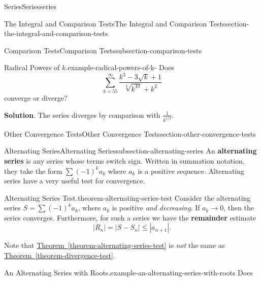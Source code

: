 \documentclass[oneside,10pt,]{book}
\newcommand{\terminology}[1]{\textbf{#1}}
\numberwithin{equation}{section}
\begin{document}
\begin{chapterptx}{Series}{}{Series}{}{}{series}
\begin{sectionptx}{The Integral and Comparison Tests}{}{The Integral and Comparison Tests}{}{}{section-the-integral-and-comparison-tests}
\begin{subsectionptx}{Comparison Tests}{}{Comparison Tests}{}{}{subsection-comparison-tests}
\begin{example}{Radical Powers of \(k\).}{example-radical-powers-of-k-}%
\hypertarget{p-896}{}%
Does%
\begin{equation*}
\sum_{k=55}^{\infty}\frac{k^{3} - 3\sqrt{k} + 1}{\sqrt[4]{k^{10}} + k^{2}}
\end{equation*}
converge or diverge?%
\par\smallskip%
\noindent\textbf{Solution}.\hypertarget{solution-184}{}\quad%
\hypertarget{p-897}{}%
The series diverges by comparison with \(\frac{1}{k^{1/3}}\).%
\end{example}
\end{subsectionptx}
\end{sectionptx}
%
%
\typeout{************************************************}
\typeout{************************************************}
%
\begin{sectionptx}{Other Convergence Tests}{}{Other Convergence Tests}{}{}{section-other-convergence-tests}
%
%
\typeout{************************************************}
\typeout{************************************************}
%
\begin{subsectionptx}{Alternating Series}{}{Alternating Series}{}{}{subsection-alternating-series}
\hypertarget{p-898}{}%
An \terminology{alternating series} is any series whose terms switch sign. Written in summation notation, they take the form \(\sum (-1)^{k}a_{k}\) where \(a_{k}\) is a positive sequence. Alternating series have a very useful test for convergence.%
\begin{theorem}{Alternating Series Test.}{}{theorem-alternating-series-test}%
\hypertarget{p-899}{}%
Consider the alternating series \(S = \sum (-1)^{k}a_{k}\), where \(a_{k}\) is positive \emph{and decreasing}. If \(a_{k}\to0\), then the series converges. Furthermore, for such a series we have the \terminology{remainder} estimate%
\begin{equation*}
|R_{n}| = |S - S_{n}| \leq |a_{n+1}|\text{.}
\end{equation*}
%
\end{theorem}
\hypertarget{p-900}{}%
Note that \hyperref[theorem-alternating-series-test]{Theorem~\ref{theorem-alternating-series-test}} is \emph{not} the same as \hyperref[theorem-divergence-test]{Theorem~\ref{theorem-divergence-test}}.%
\begin{example}{An Alternating Series with Roots.}{example-an-alternating-series-with-roots}%
\hypertarget{p-901}{}%
Does%

\end{example}
\end{subsectionptx}
\end{sectionptx}
\end{chapterptx}
\end{document}
